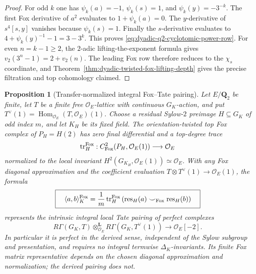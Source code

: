 \documentclass[11pt]{article}
\newtheorem{proposition}[theorem]{Proposition}
\theoremstyle{definition}
\begin{document}
\begin{proof}
For odd $k$ one has
$\psi_k(a)=-1$, $\psi_k(s)=1$,
and $\psi_k(y)=-3^{-k}$.
The first Fox derivative of $a^2$
evaluates to $1+\psi_k(a)=0$.
The $y$-derivative of $s^4[s,y]$
vanishes because $\psi_k(s)=1$.
Finally the $s$-derivative evaluates to
$4+\psi_k(y)^{-1}-1=3-3^k$.
This proves \eqref{eq:dyadic-q2-cyclotomic-power-row}.
For even $n=k-1\ge2$, the $2$-adic
lifting-the-exponent formula gives
$v_2(3^n-1)=2+v_2(n)$.
The leading Fox row therefore reduces to
the $\chi_s$ coordinate, and
Theorem~\ref{thm:dyadic-twisted-fox-lifting-depth}
gives the precise filtration and top
cohomology claimed.
\end{proof}
\begin{proposition}[Transfer-normalized integral Fox--Tate pairing]
\label{prop:dyadic-sylow-fox-tate-pairing}
Let $E/\mathbf Q_2$ be finite, let
$T$ be a finite free $\mathcal O_E$-lattice
with continuous $G_K$-action, and put
$T^\vee(1)=\operatorname{Hom}_{\mathcal O_E}
(T,\mathcal O_E)(1)$.
Choose a residual Sylow-$2$ preimage
$H\subseteq G_K$ of odd index $m$, and let
$K_H$ be its fixed field.
The orientation-twisted top Fox complex of
$P_H=H(2)$ has zero final differential and
a top-degree trace
\[
\operatorname{tr}_{H}^{\rm Fox}:
C^2_{\rm Fox}(P_H,\mathcal O_E(1))
\longrightarrow\mathcal O_E
\]
normalized to the local invariant
$H^2(G_{K_H},\mathcal O_E(1))
\simeq\mathcal O_E$.
With any Fox diagonal approximation and the
coefficient evaluation
$T\otimes T^\vee(1)\to\mathcal O_E(1)$,
the formula
\begin{equation}\label{eq:dyadic-transfer-tate-pairing}
\boxed{\quad
\langle a,b\rangle_K^{\rm Fox}
=
\frac1m\operatorname{tr}_{H}^{\rm Fox}
\left(
\operatorname{res}_{H}(a)
  \smile_{\rm Fox}
\operatorname{res}_{H}(b)
\right)\quad}
\end{equation}
represents the intrinsic integral local
Tate pairing of perfect complexes
\[
R\Gamma(G_K,T)\otimes_{\mathcal O_E}^{\mathbf L}
R\Gamma(G_K,T^\vee(1))
\longrightarrow\mathcal O_E[-2].
\]
In particular it is perfect in the derived
sense, independent of the Sylow subgroup and
presentation, and requires no integral
termwise $\Delta_K$-invariants.
Its finite Fox matrix representative depends
on the chosen diagonal approximation and
normalization; the derived pairing does not.
\end{proposition}
\end{document}
